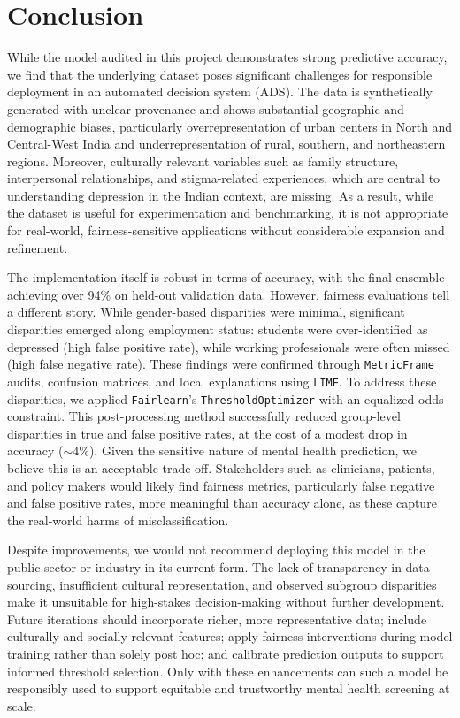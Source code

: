 \chapter{Conclusion}

While the model audited in this project demonstrates strong predictive accuracy, we find that the underlying dataset poses significant challenges for responsible deployment in an automated decision system (ADS). The data is synthetically generated with unclear provenance and shows substantial geographic and demographic biases, particularly overrepresentation of urban centers in North and Central-West India and underrepresentation of rural, southern, and northeastern regions. Moreover, culturally relevant variables such as family structure, interpersonal relationships, and stigma-related experiences, which are central to understanding depression in the Indian context, are missing. As a result, while the dataset is useful for experimentation and benchmarking, it is not appropriate for real-world, fairness-sensitive applications without considerable expansion and refinement.

The implementation itself is robust in terms of accuracy, with the final ensemble achieving over 94\% on held-out validation data. However, fairness evaluations tell a different story. While gender-based disparities were minimal, significant disparities emerged along employment status: students were over-identified as depressed (high false positive rate), while working professionals were often missed (high false negative rate). These findings were confirmed through \texttt{MetricFrame} audits, confusion matrices, and local explanations using \texttt{LIME}. To address these disparities, we applied \texttt{Fairlearn}’s \texttt{ThresholdOptimizer} with an equalized odds constraint. This post-processing method successfully reduced group-level disparities in true and false positive rates, at the cost of a modest drop in accuracy ($\sim 4\%$). Given the sensitive nature of mental health prediction, we believe this is an acceptable trade-off. Stakeholders such as clinicians, patients, and policy makers would likely find fairness metrics, particularly false negative and false positive rates, more meaningful than accuracy alone, as these capture the real-world harms of misclassification.

Despite improvements, we would not recommend deploying this model in the public sector or industry in its current form. The lack of transparency in data sourcing, insufficient cultural representation, and observed subgroup disparities make it unsuitable for high-stakes decision-making without further development. Future iterations should incorporate richer, more representative data; include culturally and socially relevant features; apply fairness interventions during model training rather than solely post hoc; and calibrate prediction outputs to support informed threshold selection. Only with these enhancements can such a model be responsibly used to support equitable and trustworthy mental health screening at scale.
